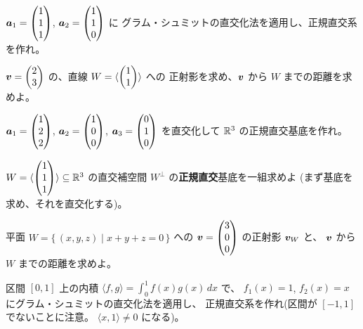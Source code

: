 \begin{mondai}[基本]\label{q:gs-ex3}
$\bm{a}_1 = \begin{pmatrix}1 \\ 1 \\ 1\end{pmatrix}$, $\bm{a}_2 = \begin{pmatrix}1 \\ 1 \\ 0\end{pmatrix}$ に
グラム・シュミットの直交化法を適用し、正規直交系を作れ。
\end{mondai}

\begin{mondai}[基本]\label{q:gs-ex4}
$\bm{v} = \begin{pmatrix}2 \\ 3\end{pmatrix}$ の、直線 $W = \langle \begin{pmatrix}1 \\ 1\end{pmatrix} \rangle$ への
正射影を求め、$\bm{v}$ から $W$ までの距離を求めよ。
\end{mondai}

\begin{mondai}[標準]\label{q:gs-ex5}
$\bm{a}_1 = \begin{pmatrix}1 \\ 2 \\ 2\end{pmatrix}$, $\bm{a}_2 = \begin{pmatrix}1 \\ 0 \\ 0\end{pmatrix}$,
$\bm{a}_3 = \begin{pmatrix}0 \\ 1 \\ 0\end{pmatrix}$ を直交化して $\mathbb{R}^3$ の正規直交基底を作れ。
\end{mondai}

\begin{mondai}[標準]\label{q:gs-ex6}
$W = \langle \begin{pmatrix}1 \\ 1 \\ 1\end{pmatrix} \rangle \subseteq \mathbb{R}^3$ の直交補空間
$W^{\perp}$ の\textbf{正規直交}基底を一組求めよ
(まず基底を求め、それを直交化する)。
\end{mondai}

\begin{mondai}[標準]\label{q:gs-ex7}
平面 $W = \{\, (x, y, z) \mid x + y + z = 0 \,\}$ への
$\bm{v} = \begin{pmatrix}3 \\ 0 \\ 0\end{pmatrix}$ の正射影 $\bm{v}_W$ と、
$\bm{v}$ から $W$ までの距離を求めよ。
\end{mondai}

\begin{mondai}[標準]\label{q:gs-ex8}
区間 $[0, 1]$ 上の内積 $\langle f, g \rangle = \int_0^1 f(x)g(x)\,dx$ で、
$f_1(x) = 1$, $f_2(x) = x$ にグラム・シュミットの直交化法を適用し、
正規直交系を作れ(区間が $[-1, 1]$ でないことに注意。
$\langle x, 1 \rangle \neq 0$ になる)。
\end{mondai}

